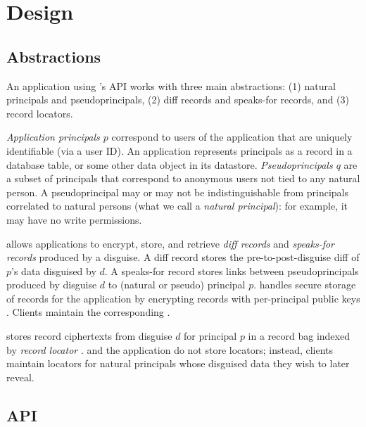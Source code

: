 \section{Design}
\label{s:design}

\subsection{Abstractions}
An application using \sys's API works with three main abstractions: (1) natural principals and
pseudoprincipals, (2) diff records and speaks-for records, and (3) record locators.

\emph{Application principals $p$} correspond to users of the application that are uniquely identifiable
(\eg via a user ID). An application represents principals as \eg a record in a  database
table, or some other data object in its datastore.
\emph{Pseudoprincipals $q$} are a subset of principals that correspond to anonymous users not tied to any natural
person. A pseudoprincipal may or may not be indistinguishable from principals correlated to natural
persons (what we call a \emph{natural principal}): for example, it
may have no write permissions.

\sys allows applications to encrypt, store, and retrieve \emph{diff records} and \emph{speaks-for
records} produced by a disguise. A diff record  stores the pre-to-post-disguise diff of
$p$'s data disguised by $d$. A speaks-for record  stores links between pseudoprincipals
produced by disguise $d$ to (natural or pseudo) principal $p$.
\sys handles secure storage of records for the application by encrypting records with per-principal
public keys . Clients maintain the corresponding .

\sys stores record ciphertexts from disguise $d$ for principal $p$ in a record bag indexed by 
\emph{record locator }. \sys and the application do not store locators; instead, 
clients maintain locators for natural principals whose disguised data they wish to later reveal.

\subsection{API}
\label{s:api}



